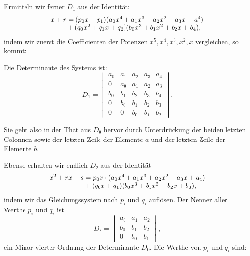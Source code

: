 Ermitteln wir ferner $D_1$ aus der Identität:
\[
\begin{array}{l}
x+r = (p_0x+p_1)(a_0x^4+a_1x^3+a_2x^2+a_3x+a^4) %
\\
\hphantom{x+r} + (q_0x^2+q_1x+q_2)(b_0x^3+b_1x^2+b_2x+b_4), %
\end{array}
\]
indem wir zuerst die Coefficienten der Potenzen $x^5, x^4, x^3, x^2, x$ vergleichen, so kommt:

Die Determinante des Systems ist:
\[
D_1 =
\begin{vmatrix}
a_0 & a_1 & a_2 & a_3 & a_4 \\
0 & a_0 & a_1 & a_2 & a_3 \\
b_0 & b_1 & b_2 & b_3 & b_4 \\
0 & b_0 & b_1 & b_2 & b_3 \\
0 & 0 & b_0 & b_1 & b_2
\end{vmatrix}.
\]

Sie geht also in der That aus $D_0$ hervor durch Unterdrückung der beiden letzten Colonnen sowie der letzten Zeile der Elemente $a$ und der letzten Zeile der Elemente $b$.

Ebenso erhalten wir endlich $D_2$ aus der Identität
\[
\begin{array}{l}
x^2+rx+s = p_0x\cdot(a_0x^4+a_1x^3+a_2x^2+a_3x+a_4) \\
\hphantom{x^2+rx+s} + (q_0x+q_1)(b_0x^3+b_1x^2+b_2x+b_3),
\end{array}
\]
indem wir das Gleichungssystem
nach $p_i$ und $q_i$ auflösen. Der Nenner aller Werthe $p_i$ und $q_i$ ist
\[
D_2 =
\begin{vmatrix}
a_0 & a_1 & a_2 \\
b_0 & b_1 & b_2 \\
0 & b_0 & b_1
\end{vmatrix},
\]
ein Minor vierter Ordnung der Determinante $D_0$. Die Werthe von $p_i$ und $q_i$ sind:


